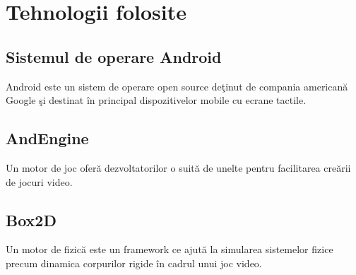 \documentclass[a4paper,12pt]{article}
\begin{document}
\section{Tehnologii folosite}
	\subsection{Sistemul de operare Android}
Android este un sistem de operare open source deţinut de compania americană Google
şi destinat în principal dispozitivelor mobile cu ecrane tactile.
	\subsection{AndEngine}
Un motor de joc oferă dezvoltatorilor o suită de unelte pentru facilitarea creării de
jocuri video.
	\subsection{Box2D}
Un motor de fizică este un framework ce ajută la simularea sistemelor fizice precum
dinamica corpurilor rigide în cadrul unui joc video. 
\end{document}
